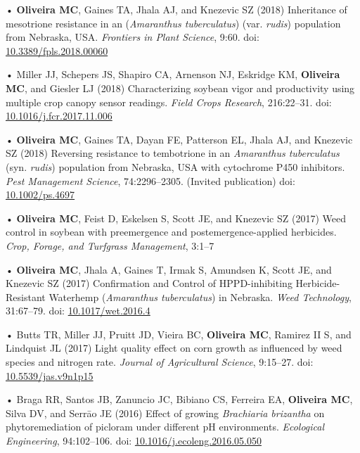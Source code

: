 \documentclass[11pt,]{article}
\begin{document}
• \textbf{Oliveira MC}, Gaines TA, Jhala AJ, and Knezevic SZ (2018)
Inheritance of mesotrione resistance in an (\emph{Amaranthus
tuberculatus}) (var. \emph{rudis}) population from Nebraska, USA.
\emph{Frontiers in Plant Science}, 9:60. doi:
\href{https://www.frontiersin.org/articles/10.3389/fpls.2018.00060/full}{10.3389/fpls.2018.00060}

• Miller JJ, Schepers JS, Shapiro CA, Arnenson NJ, Eskridge KM,
\textbf{Oliveira MC}, and Giesler LJ (2018) Characterizing soybean vigor
and productivity using multiple crop canopy sensor readings. \emph{Field
Crops Research}, 216:22--31. doi:
\href{https://www.sciencedirect.com/science/article/pii/S0378429017310341}{10.1016/j.fcr.2017.11.006}

• \textbf{Oliveira MC}, Gaines TA, Dayan FE, Patterson EL, Jhala AJ, and
Knezevic SZ (2018) Reversing resistance to tembotrione in an
\emph{Amaranthus tuberculatus} (syn. \emph{rudis}) population from
Nebraska, USA with cytochrome P450 inhibitors. \emph{Pest Management
Science}, 74:2296--2305. (Invited publication) doi:
\href{https://onlinelibrary.wiley.com/doi/full/10.1002/ps.4697}{10.1002/ps.4697}

• \textbf{Oliveira MC}, Feist D, Eskelsen S, Scott JE, and Knezevic SZ
(2017) Weed control in soybean with preemergence and
postemergence-applied herbicides. \emph{Crop, Forage, and Turfgrass
Management}, 3:1--7

• \textbf{Oliveira MC}, Jhala A, Gaines T, Irmak S, Amundsen K, Scott
JE, and Knezevic SZ (2017) Confirmation and Control of HPPD-inhibiting
Herbicide-Resistant Waterhemp (\emph{Amaranthus tuberculatus}) in
Nebraska. \emph{Weed Technology}, 31:67--79. doi:
\href{https://www.cambridge.org/core/journals/weed-technology/article/confirmation-and-control-of-hppdinhibiting-herbicideresistant-waterhemp-amaranthus-tuberculatus-in-nebraska/69C31C7039DBE3FD49A55C73EEE5F2EE}{10.1017/wet.2016.4}

• Butts TR, Miller JJ, Pruitt JD, Vieira BC, \textbf{Oliveira MC},
Ramirez II S, and Lindquist JL (2017) Light quality effect on corn
growth as influenced by weed species and nitrogen rate. \emph{Journal of
Agricultural Science}, 9:15--27. doi:
\href{http://www.ccsenet.org/journal/index.php/jas/article/view/63437}{10.5539/jas.v9n1p15}

• Braga RR, Santos JB, Zanuncio JC, Bibiano CS, Ferreira EA,
\textbf{Oliveira MC}, Silva DV, and Serrāo JE (2016) Effect of growing
\emph{Brachiaria brizantha} on phytoremediation of picloram under
different pH environments. \emph{Ecological Engineering}, 94:102--106.
doi:
\href{https://www.sciencedirect.com/science/article/pii/S0925857416302853}{10.1016/j.ecoleng.2016.05.050}
\end{document}
